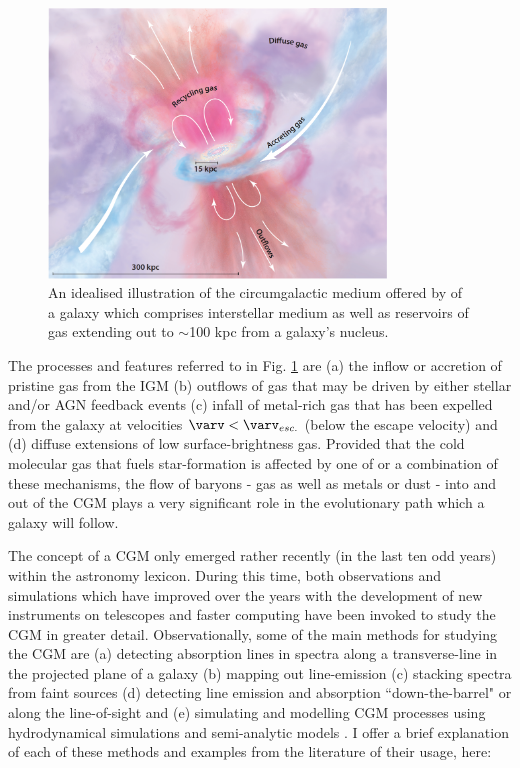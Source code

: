 \documentclass[10pt,a4paper]{article}
\begin{document}
\begin{figure}[!ht]
 \centering
 \includegraphics[width=0.8\textwidth]{plots_chp1/CGM_Tumlinson_2017.png}
 \caption[A general view of a galaxy's circumgalactic medium (CGM)]{An idealised illustration of the circumgalactic medium offered by \citet{tumlinson2017} of a galaxy which comprises interstellar medium as well as reservoirs of gas extending out to $\sim$100 kpc from a galaxy's nucleus. }
 \label{fig:CGM-Tumlinson2017}
\end{figure}

The processes and features referred to in Fig. \ref{fig:CGM-Tumlinson2017} are (a) the inflow or accretion of pristine gas from the IGM (b) outflows of gas that may be driven by either stellar and/or AGN feedback events (c) infall of metal-rich gas that has been expelled from the galaxy at velocities $\varv < \varv_{esc.}$ (below the escape velocity) and (d) diffuse extensions of low surface-brightness gas. Provided that the cold molecular gas that fuels star-formation is affected by one of or a combination of these mechanisms, the flow of baryons - gas as well as metals or dust - into and out of the CGM plays a very significant role in the evolutionary path which a galaxy will follow. 

The concept of a CGM only emerged rather recently (in the last ten odd years) within the astronomy lexicon. During this time, both observations and simulations which have improved over the years with the development of new instruments on telescopes and faster computing have been invoked to study the CGM in greater detail. Observationally, some of the main methods for studying the CGM are (a) detecting absorption lines in spectra along a transverse-line in the projected plane of a galaxy (b) mapping out line-emission (c) stacking spectra from faint sources (d) detecting line emission and absorption ``down-the-barrel" or along the line-of-sight and (e) simulating and modelling CGM processes using hydrodynamical simulations and semi-analytic models \citep{tumlinson2017}. I offer a brief explanation of each of these methods and examples from the literature of their usage, here: 
\end{document}
